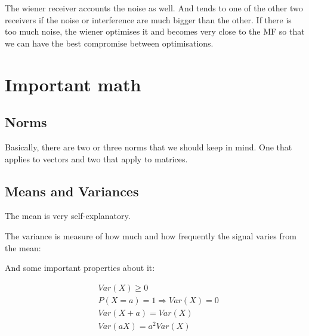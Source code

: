 \documentclass[12pt, a4paper]{article}
\begin{document}
The wiener receiver accounts the noise as well. And tends to one of the other two receivers if the noise or interference are much bigger than the other. If there is too much noise, the wiener optimises it and becomes very close to the MF so that we can have the best compromise between optimisations.




\section{Important math} \label{sec:important_math}

\subsection{Norms} \label{sec:important_math_norms}
\par Basically, there are two or three norms that we should keep in mind. One that applies to vectors and two that apply to matrices.




\subsection{Means and Variances} \label{sec:important_math_variances}


\par The mean is very self-explanatory.
\par The variance is measure of how much and how frequently the signal varies from the mean:


\par And some important properties about it:

\begin{align}
    & Var(X) \geq 0 \\
    & P(X = a) = 1  \Rightarrow Var(X) = 0 \\
    & Var(X + a) = Var(X) \\
    & Var(aX) = a^2 Var(X)
\end{align}
\end{document}
